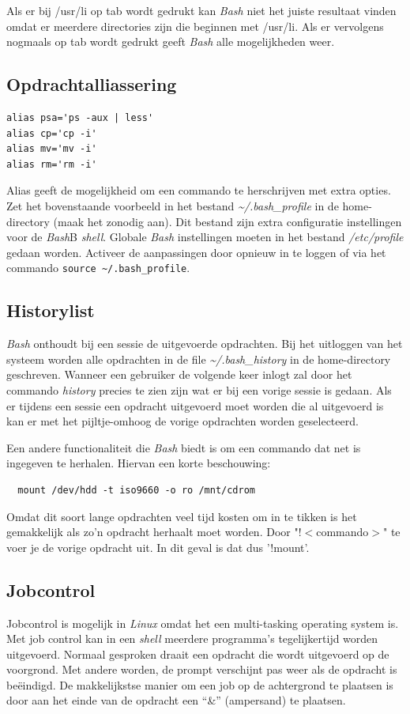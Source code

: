 Als er bij /usr/li op tab wordt gedrukt kan \emph{Bash} niet het juiste resultaat vinden omdat er meerdere directories zijn die beginnen met /usr/li. Als er vervolgens nogmaals op tab wordt gedrukt geeft \emph{Bash} alle mogelijkheden weer.

\subsection{Opdrachtalliassering}
\begin{lstlisting}
alias psa='ps -aux | less'
alias cp='cp -i'
alias mv='mv -i'
alias rm='rm -i'
\end{lstlisting}
Alias geeft de mogelijkheid om een commando te herschrijven met extra opties. Zet het bovenstaande voorbeeld in het bestand \emph{\~{}/.bash\_profile} in de home-directory (maak het zonodig aan). Dit bestand zijn extra configuratie instellingen voor de \emph{Bash}B \emph{shell}. Globale \emph{Bash} instellingen moeten in het bestand \emph{/etc/profile} gedaan worden. Activeer de aanpassingen door opnieuw in te loggen of via het commando \texttt{source \~{}/.bash\_profile}.

\subsection{Historylist}
\emph{Bash} onthoudt bij een sessie de uitgevoerde opdrachten. Bij het uitloggen van het systeem worden alle opdrachten in de file \emph{\~{}/.bash\_history} in de home-directory geschreven. Wanneer een gebruiker de volgende keer inlogt zal door het commando \emph{history} precies te zien zijn wat er bij een vorige sessie is gedaan. Als er tijdens een sessie een opdracht uitgevoerd moet worden die al uitgevoerd is kan er met het pijltje-omhoog de vorige opdrachten worden geselecteerd.

Een andere functionaliteit die \emph{Bash} biedt is om een commando dat net is ingegeven te herhalen. Hiervan een korte beschouwing:
\begin{lstlisting}
  mount /dev/hdd -t iso9660 -o ro /mnt/cdrom
\end{lstlisting}
Omdat dit soort lange opdrachten veel tijd kosten om in te tikken is het gemakkelijk als zo'n opdracht herhaalt moet worden. Door "!$<$commando$>$" te voer je de vorige opdracht uit. In dit geval is dat dus '!mount'.

\subsection{Jobcontrol}
Jobcontrol is mogelijk in \emph{Linux} omdat het een multi-tasking operating system is. Met job control kan in een \emph{shell} meerdere programma's tegelijkertijd worden uitgevoerd. Normaal gesproken draait een opdracht die wordt uitgevoerd op de voorgrond. Met andere worden, de prompt verschijnt pas weer als de opdracht is be\"{e}indigd. De makkelijkstse manier om een job op de achtergrond te plaatsen is door aan het einde van de opdracht een ``\&'' (ampersand) te plaatsen.\index{\&}

